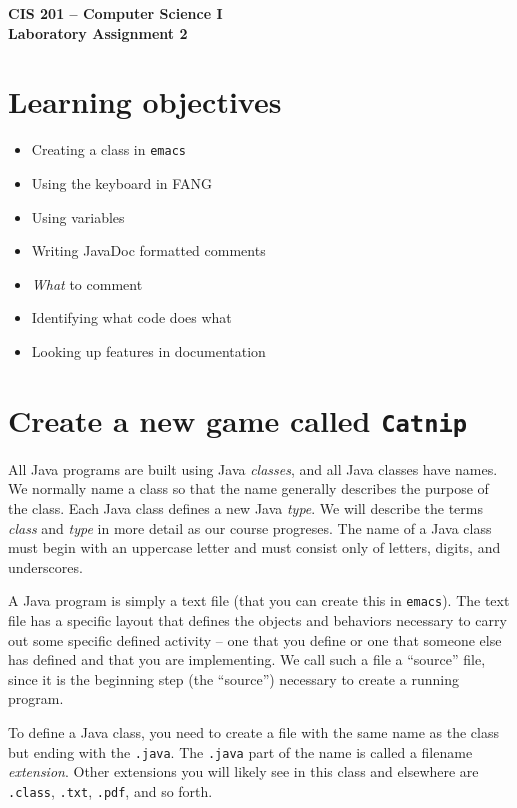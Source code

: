 \documentclass[12pt]{article}
\newcommand{\fname}[1]{\texttt{#1}}
\newcommand{\code}[1]{\texttt{#1}}
\begin{document}
\begin{center}
\Large\bf
CIS 201 -- Computer Science I\\
Laboratory Assignment 2\\
\end{center}

\section*{Learning objectives}

\begin{itemize}
\item Creating a class in \fname{emacs}
\item Using the keyboard in FANG
\item Using variables
\item Writing JavaDoc formatted comments
\item \emph{What} to comment
\item Identifying what code does what
\item Looking up features in documentation
\end{itemize}

\centerline{}

\section*{Create a new game called \code{Catnip}}

All Java programs are built using Java \emph{classes},
and all Java classes have names.
We normally name a class so that the name
generally describes the purpose of the class.
Each Java class defines a new Java \emph{type}.
We will describe the terms \emph{class} and \emph{type}
in more detail as our course progreses.
The name of a Java class must begin with an uppercase letter
and must consist only of letters, digits, and underscores.

A Java program is simply a text file
(that you can create this in \fname{emacs}).
The text file has a specific layout
that defines the objects and behaviors necessary
to carry out some specific defined activity --
one that you define or one that someone else has defined
and that you are implementing.
We call such a file a ``source'' file,
since it is the beginning step (the ``source'') necessary
to create a running program.

To define a Java class,
you need to create a file with the same name as the class
but ending with the \fname{.java}.
The \fname{.java} part of the name is called a filename {\em extension}.
Other extensions you will likely see in this class and elsewhere
are \fname{.class}, \fname{.txt}, \fname{.pdf}, and so forth.
\end{document}

